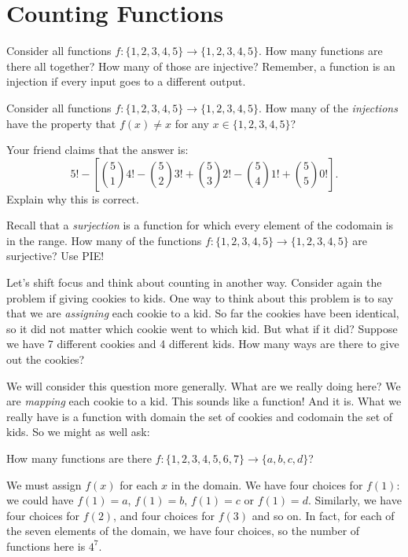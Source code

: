 \documentclass[12pt]{article}
\begin{document}

\section{Counting Functions}\label{sec:count-functions}

  


\begin{activity}
\begin{questions}
\question Consider all functions $f: \{1,2,3,4,5\} \to \{1,2,3,4,5\}$.  How many functions are there all together?  How many of those are injective?  Remember, a function is an injection if every input goes to a different output.

\question Consider all functions $f: \{1,2,3,4,5\} \to \{1,2,3,4,5\}$.  How many of the {\em injections} have the property that $f(x) \ne x$ for any $x \in \{1,2,3,4,5\}$?

Your friend claims that the answer is:
\[5! - \left[ {5\choose 1}4! - {5 \choose 2}3! + {5\choose 3}2! - {5 \choose 4}1! + {5\choose 5}0! \right].\]
Explain why this is correct.

\question Recall that a {\em surjection} is a function for which every element of the codomain is in the range.  How many of the functions $f: \{1,2,3,4,5\} \to \{1,2,3,4,5\}$ are surjective?  Use PIE!

\end{questions}
\end{activity}

Let's shift focus and think about counting in another way.  Consider again the problem if giving cookies to kids.  One way to think about this problem is to say that we are {\em assigning} each cookie to a kid.  So far the cookies have been identical, so it did not matter which cookie went to which kid.  But what if it did?  Suppose we have 7 different cookies and 4 different kids.  How many ways are there to give out the cookies?

We will consider this question more generally.  What are we really doing here?  We are {\em mapping} each cookie to a kid.  This sounds like a function!  And it is.  What we really have is a function with domain the set of cookies and codomain the set of kids.  So we might as well ask:

\begin{example}
 How many functions are there $f: \{1,2,3,4,5,6,7\} \to \{a,b,c,d\}$?\footnotemark
 \begin{solution}
 	We must assign $f(x)$ for each $x$ in the domain.  We have four choices for $f(1)$: we could have $f(1) = a$, $f(1) = b$, $f(1) = c$ or $f(1) = d$.  Similarly, we have four choices for $f(2)$, and four choices for $f(3)$ and so on.  In fact, for each of the seven elements of the domain, we have four choices, so the number of functions here is $4^7$.  
 \end{solution}
\end{example}
\end{document}
